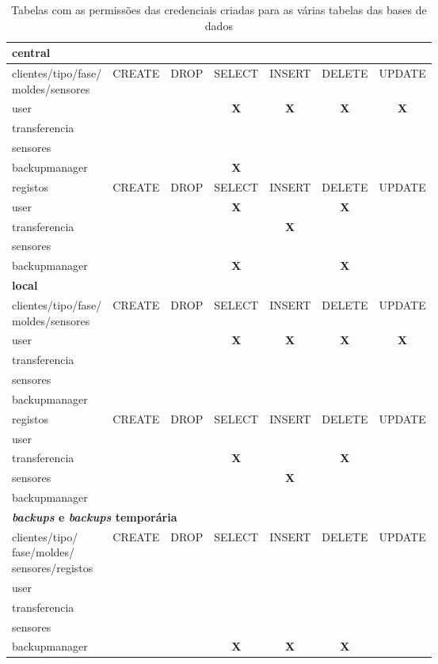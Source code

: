 \documentclass[11pt,twoside,a4paper]{report}
\begin{document}
\begin{table}[H]
	\begin{tabular}{|l|c|c|c|c|c|c|}
		\hline
		\multicolumn{7}{|l|}{\textbf{central}} \\ \hline
		\makecell{clientes/tipo/fase/\\moldes/sensores} & CREATE & DROP & SELECT & INSERT & DELETE & UPDATE \\ \hline
		user & & & \textbf{X} & \textbf{X} & \textbf{X} & \textbf{X} \\ \hline
		transferencia & & & & & & \\ \hline
		sensores & & & & & & \\ \hline
		backupmanager & & & \textbf{X} & & & \\ \hline
		registos & CREATE & DROP & SELECT & INSERT & DELETE & UPDATE \\ \hline
		user & & & \textbf{X} & & \textbf{X} & \\ \hline
		transferencia & & & & \textbf{X} & & \\ \hline
		sensores & & & & & & \\ \hline
		backupmanager & & & \textbf{X} & & \textbf{X} & \\ \hline
		\multicolumn{7}{|l|}{\textbf{local}} \\ \hline
		\makecell{clientes/tipo/fase/\\moldes/sensores} & CREATE & DROP & SELECT & INSERT & DELETE & UPDATE \\ \hline
		user & & & \textbf{X} & \textbf{X} & \textbf{X} & \textbf{X} \\ \hline
		transferencia & & & & & & \\ \hline
		sensores & & & & & & \\ \hline
		backupmanager & & & & & & \\ \hline
		registos & CREATE & DROP & SELECT & INSERT & DELETE & UPDATE \\ \hline
		user & & & & & & \\ \hline
		transferencia & & & \textbf{X} & & \textbf{X} & \\ \hline
		sensores & & & & \textbf{X} & & \\ \hline
		backupmanager & & & & & & \\ \hline
		\multicolumn{7}{|l|}{\textbf{\textit{backups} e \textit{backups} temporária}} \\ \hline
		\makecell{clientes/tipo/\\fase/moldes/\\sensores/registos} & CREATE & DROP & SELECT & INSERT & DELETE & UPDATE \\ \hline
		user & & & & & & \\ \hline
		transferencia & & & & & & \\ \hline
		sensores & & & & & & \\ \hline
		backupmanager & & & \textbf{X} & \textbf{X} & \textbf{X} & \\ \hline
	\end{tabular}
	\caption{Tabelas com as permissões das credenciais criadas para as várias tabelas das bases de dados}
	\label{tab:utilizadores1}
\end{table}
\end{document}
